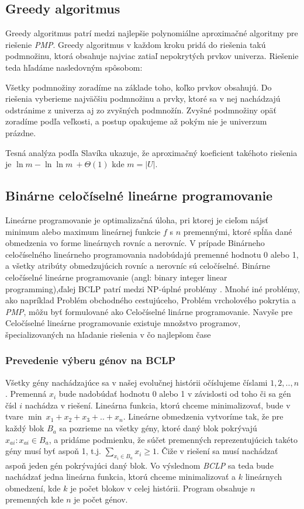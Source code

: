 \subsection{Greedy algoritmus}
Greedy algoritmus patrí medzi najlepšie polynomiálne aproximačné algoritmy pre riešenie \emph{PMP}.\cite{Slavik}
Greedy algoritmus v každom kroku pridá do riešenia takú podmnožinu,
ktorá obsahuje najviac zatiaľ nepokrytých prvkov univerza. Riešenie teda hľadáme nasledovným spôsobom:

Všetky podmnožiny zoradíme na základe toho, koľko prvkov obsahujú.
Do riešenia vyberieme najväčšiu podmnožinu a prvky, ktoré sa v nej nachádzajú odstránime z
univerza aj zo zvyšných podmnožín. Zvyšné podmnožiny opäť zoradíme podľa veľkosti,
a postup opakujeme až pokým nie je univerzum prázdne.

Tesná analýza podľa Slavíka ukazuje, že aproximačný koeficient takéhoto riešenia je \(\ln m - \ln \ln m\ +\Theta(1) \) \cite{Slavik} 
kde \(m = |U|\).
\subsection{Binárne celočíselné lineárne programovanie}
\label{sub:bclp}
Lineárne programovanie je optimalizačná úloha, pri ktorej je cieľom nájsť minimum alebo
maximum lineárnej funkcie $f$ s $n$ premennými, ktoré spĺňa dané obmedzenia vo forme lineárnych rovníc a nerovníc.
V prípade Binárneho celočíselného lineárneho programovania nadobúdajú premenné hodnotu 0 alebo 1,
a všetky atribúty obmedzujúcich rovníc a nerovníc sú celočíselné.
Binárne celočíselné lineárne programovanie (angl: binary integer linear programming),ďalej BCLP patrí medzi NP-úplné problémy \cite{Karp}.
Mnohé iné problémy, ako napríklad Problém obchodného cestujúceho, Problém vrcholového pokrytia a \emph{PMP}, môžu byť formulované 
ako Celočíselné linárne programovanie.
Navyše pre Celočíselné lineárne programovanie existuje množstvo programov,
špecializovaných na hľadanie riešenia v čo najlepšom čase \cite{wiki:lp} 
\subsubsection{Prevedenie výberu génov na BCLP}
Všetky gény nachádzajúce sa v našej evolučnej histórii očíslujeme číslami $1,2,..,n$.
Premenná $x_i$ bude nadobúdať hodnotu 0 alebo 1 v závislosti od toho či sa gén čísl $i$ nachádza v riešení.
Lineárna funkcia, ktorú chceme minimalizovať, bude v tvare \(\min \ x_1 + x_2 +x_3 + .. +x_n\). 
Lineárne obmedzenia vytvoríme tak,
že pre každý blok $B_a$ sa pozrieme na všetky gény, ktoré daný blok pokrývajú $x_{ai}:x_{ai} \in B_a$,
a pridáme podmienku, že súčet premenných reprezentujúcich takéto gény musí byť aspoň 1,
t.j. \(\sum_{x_i \in B_a}x_i \ge 1\).
Čiže v riešení sa musí nachádzať aspoň jeden gén pokrývajúci daný blok.
Vo výslednom \emph{BCLP} sa teda bude nachádzať jedna lineárna funkcia, ktorú chceme minimalizovať a 
$k$ lineárnych obmedzení, kde $k$ je počet blokov v celej histórii. Program obsahuje $n$ premenných kde $n$ je počet génov.
